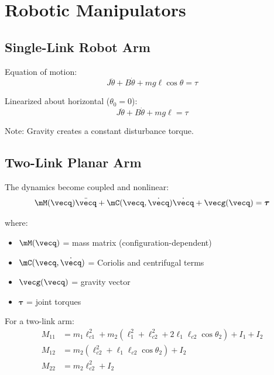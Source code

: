 \section{Robotic Manipulators}
\label{sec:robotics}

\subsection{Single-Link Robot Arm}



Equation of motion:
\begin{equation}
J\ddot{\theta} + B\dot{\theta} + mg\ell\cos\theta = \tau
\end{equation}

Linearized about horizontal ($\theta_0 = 0$):
\begin{equation}
J\ddot{\theta} + B\dot{\theta} + mg\ell = \tau
\end{equation}

Note: Gravity creates a constant disturbance torque.

\subsection{Two-Link Planar Arm}

The dynamics become coupled and nonlinear:
\begin{equation}
\mM(\vecq)\ddot{\vecq} + \mC(\vecq, \dot{\vecq})\dot{\vecq} + \vecg(\vecq) = \boldsymbol{\tau}
\end{equation}

where:
\begin{itemize}
    \item $\mM(\vecq)$ = mass matrix (configuration-dependent)
    \item $\mC(\vecq, \dot{\vecq})$ = Coriolis and centrifugal terms
    \item $\vecg(\vecq)$ = gravity vector
    \item $\boldsymbol{\tau}$ = joint torques
\end{itemize}

For a two-link arm:
\begin{align}
M_{11} &= m_1 \ell_{c1}^2 + m_2(\ell_1^2 + \ell_{c2}^2 + 2\ell_1\ell_{c2}\cos\theta_2) + I_1 + I_2 \\
M_{12} &= m_2(\ell_{c2}^2 + \ell_1\ell_{c2}\cos\theta_2) + I_2 \\
M_{22} &= m_2\ell_{c2}^2 + I_2
\end{align}

